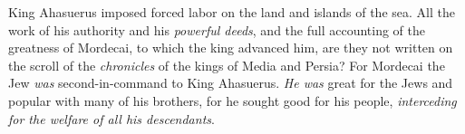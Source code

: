 \begin{biblechapter} %
 King Ahasuerus imposed forced labor on the land and islands of the sea.
\verse All the work of his authority and his \textit{powerful deeds}, and the full accounting of the greatness of Mordecai, to which the king advanced him, are they not written on the scroll of the \textit{chronicles} of the kings of Media and Persia?
\verse For Mordecai the Jew \textit{was} second-in-command to King Ahasuerus. \textit{He was} great for the Jews and popular with many of his brothers, for he sought good for his people, \textit{interceding for the welfare of all his descendants}.
\end{biblechapter}

